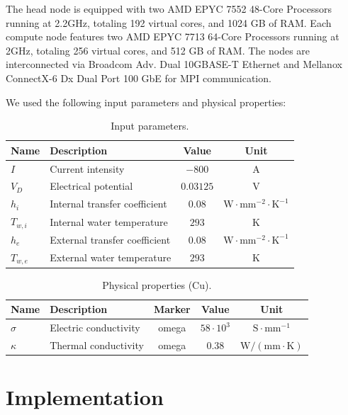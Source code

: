 \documentclass[12pt]{article}
\begin{document}
The head node is equipped with two AMD EPYC 7552 48-Core Processors running at 
2.2GHz, totaling 192 virtual cores, and 1024 GB of RAM. 
Each compute node features two AMD EPYC 7713 64-Core Processors running at 2GHz, 
totaling 256 virtual cores, and 512 GB of RAM. The nodes are interconnected via 
Broadcom Adv. Dual 10GBASE-T Ethernet and Mellanox ConnectX-6 Dx Dual Port 100 
GbE for MPI communication.

We used the following input parameters and physical properties:

\begin{table}[H]
	\centering
	\begin{tabular}{|l|l|c|c|}
	\hline
	\textbf{Name} & \textbf{Description} & \textbf{Value} & \textbf{Unit} \\ \hline
	$I$ & Current intensity & $-800$ & A \\ \hline
	$V_D$ & Electrical potential & $0.03125$ & V \\ \hline
	$h_i$ & Internal transfer coefficient & $0.08$ & $\mathrm{W \cdot mm^{-2} \cdot K^{-1}}$ \\ \hline
	$T_{w,i}$ & Internal water temperature & $293$ & K \\ \hline
	$h_e$ & External transfer coefficient & $0.08$ & $\mathrm{W \cdot mm^{-2} \cdot K^{-1}}$ \\ \hline
	$T_{w,e}$ & External water temperature & $293$ & K \\ \hline
	\end{tabular}
	\caption{Input parameters.}
	\label{tab:input_parameters}
	\end{table}

	\begin{table}[H]
		\centering
		\begin{tabular}{|l|l|c|c|c|}
		\hline
		\textbf{Name} & \textbf{Description} & \textbf{Marker} & \textbf{Value} & \textbf{Unit} \\ \hline
		$\sigma$ & Electric conductivity & omega & $58 \cdot 10^3$ & $\mathrm{S \cdot mm^{-1}}$ \\ \hline
		$\kappa$ & Thermal conductivity & omega & $0.38$ & $\mathrm{W/(mm \cdot K)}$ \\ \hline
		\end{tabular}
		\caption{Physical properties (Cu).}
		\label{tab:physical_properties}
	\end{table}


			

\section{Implementation}
\end{document}
